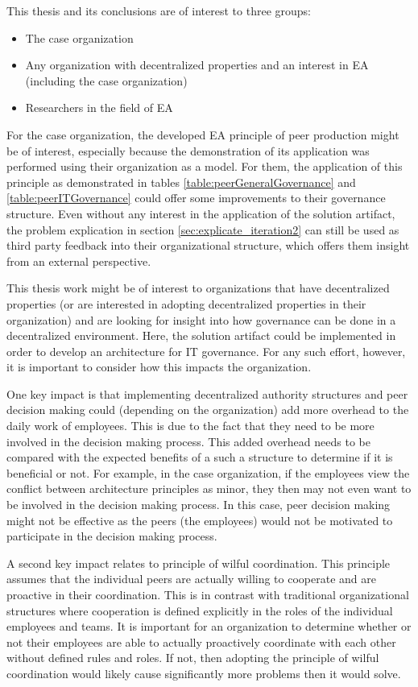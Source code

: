This thesis and its conclusions are of interest to three groups:
\begin{itemize}
\item The case organization
\item Any organization with decentralized properties and an interest in EA (including the case organization)
\item Researchers in the field of EA
\end{itemize}

For the case organization, the developed EA principle of peer production might be of interest, especially because the demonstration of its application was performed using their organization as a model. For them, the application of this principle as demonstrated in tables \ref{table:peerGeneralGovernance} and \ref{table:peerITGovernance} could offer some improvements to their governance structure. Even without any interest in the application of the solution artifact, the problem explication in section \ref{sec:explicate_iteration2} can still be used as third party feedback into their organizational structure, which offers them insight from an external perspective.

This thesis work might be of interest to organizations that have decentralized properties (or are interested in adopting decentralized properties in their organization) and are looking for insight into how governance can be done in a decentralized environment. Here, the solution artifact could be implemented in order to develop an architecture for IT governance. For any such effort, however, it is important to consider how this impacts the organization.

One key impact is that implementing decentralized authority structures and peer decision making could (depending on the organization) add more overhead to the daily work of employees. This is due to the fact that they need to be more involved in the decision making process. This added overhead needs to be compared with the expected benefits of a such a structure to determine if it is beneficial or not. For example, in the case organization, if the employees view the conflict between architecture principles as minor, they then may not even want to be involved in the decision making process. In this case, peer decision making might not be effective as the peers (the employees) would not be motivated to participate in the decision making process. 

A second key impact relates to principle of wilful coordination. This principle assumes that the individual peers are actually willing to cooperate and are proactive in their coordination. This is in contrast with traditional organizational structures where cooperation is defined explicitly in the roles of the individual employees and teams. It is important for an organization to determine whether or not their employees are able to actually proactively coordinate with each other without defined rules and roles. If not, then adopting the principle of wilful coordination would likely cause significantly more problems then it would solve.  


